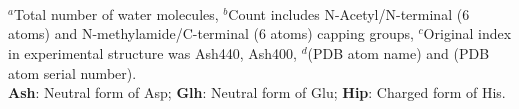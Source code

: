\documentclass[phd,tocprelim]{cornell}
\begin{document}
\begin{landscape}
\begin{table}
	\\
	\medskip 
	\\
	\small
	\\
	$^{a}$Total number of water molecules, %
	$^{b}$Count includes N-Acetyl/N-terminal (6 atoms) and N-methylamide/C-terminal (6 atoms) capping groups, %
	$^{c}$Original index in experimental structure was Ash440, Ash400, %
	$^{d}$(PDB atom name) and (PDB atom serial number).\\
	\textbf{Ash}: Neutral form of Asp; \textbf{Glh}: Neutral form of Glu; \textbf{Hip}: Charged form of His.\\
\end{table}
\end{landscape}
\end{document}

